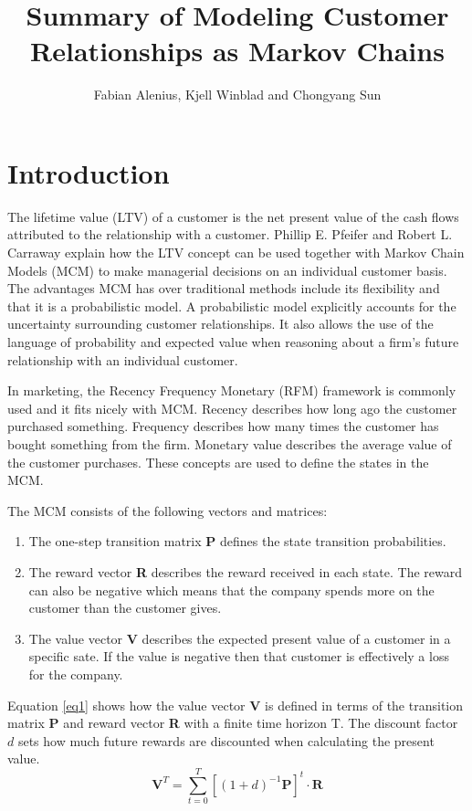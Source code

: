 \documentclass[11pt]{article}
\author{Fabian Alenius, Kjell Winblad and Chongyang Sun}
\title{Summary of Modeling Customer Relationships as Markov Chains}
\begin{document}
\maketitle


\section{Introduction}
The lifetime value (LTV) of a customer is the net present value of the cash flows attributed to the relationship with a customer.
Phillip E. Pfeifer and Robert L. Carraway \cite{customer} explain how the LTV concept can be used together with Markov Chain Models (MCM) to make managerial decisions on an individual customer basis. %
The advantages MCM has over traditional methods include its flexibility and that it is a probabilistic model.
A probabilistic model explicitly accounts for the uncertainty surrounding customer relationships.
It also allows the use of the language of probability and expected value when reasoning about a firm's future relationship with an individual customer.

In marketing, the Recency Frequency Monetary (RFM) framework is commonly used and it fits nicely with MCM.
Recency describes how long ago the customer purchased something.
Frequency describes how many times the customer has bought something from the firm.
Monetary value describes the average value of the customer purchases.
These concepts are used to define the states in the MCM.

The MCM consists of the following vectors and matrices: 
\begin{enumerate}
\item The one-step transition matrix \textbf{P} defines the state transition probabilities.
\item The reward vector \textbf{R} describes the reward received in each state. The reward can also be negative which means that the company spends more on the customer than the customer gives.
\item The value vector \textbf{V} describes the expected present value of a customer in a specific sate. If the value is negative then that customer is effectively a loss for the company.
\end{enumerate}

Equation \ref{eq1} shows how the value vector \textbf{V} is defined in terms of the transition matrix \textbf{P} and reward vector \textbf{R} with a finite time horizon T.
The discount factor $d$ sets how much future rewards are discounted when calculating the present value.
\begin{equation}\label{eq1}
\textbf{V}^T = \sum_{t=0}^T  [(1 + d)^{-1} \textbf{P}]^t \cdot \textbf{R}
\end{equation}
\end{document}

